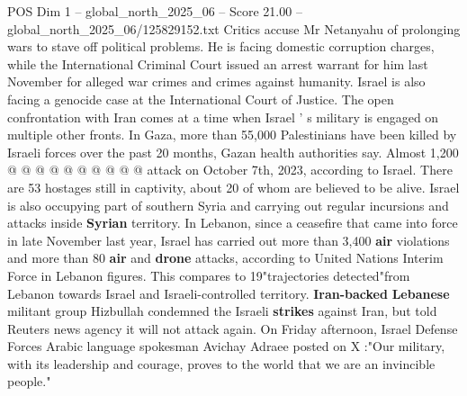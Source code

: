 \begin{textsample}{POS Dim 1 – global\_north\_2025\_06 – Score 21.00 – global\_north\_2025\_06/125829152.txt}
Critics accuse Mr Netanyahu of prolonging wars to stave off political problems.
He is facing domestic corruption charges, while the International Criminal Court issued an arrest warrant for him last November for alleged war crimes and crimes against humanity.
Israel is also facing a genocide case at the International Court of Justice.
The open confrontation with Iran comes at a time when Israel ' s military is engaged on multiple other fronts.
In Gaza, more than 55,000 Palestinians have been killed by Israeli forces over the past 20 months, Gazan health authorities say.
Almost 1,200 @ @ @ @ @ @ @ @ @ @ attack on October 7th, 2023, according to Israel.
There are 53 hostages still in captivity, about 20 of whom are believed to be alive.
Israel is also occupying part of southern Syria and carrying out regular incursions and attacks inside \textbf{Syrian} territory.
In Lebanon, since a ceasefire that came into force in late November last year, Israel has carried out more than 3,400 \textbf{air} violations and more than 80 \textbf{air} and \textbf{drone} attacks, according to United Nations Interim Force in Lebanon figures.
This compares to 19"trajectories detected"from Lebanon towards Israel and Israeli-controlled territory. \textbf{Iran-backed} \textbf{Lebanese} militant group Hizbullah condemned the Israeli \textbf{strikes} against Iran, but told Reuters news agency it will not attack again.
On Friday afternoon, Israel Defense Forces Arabic language spokesman Avichay Adraee posted on X :"Our military, with its leadership and courage, proves to the world that we are an invincible people."

\end{textsample}
